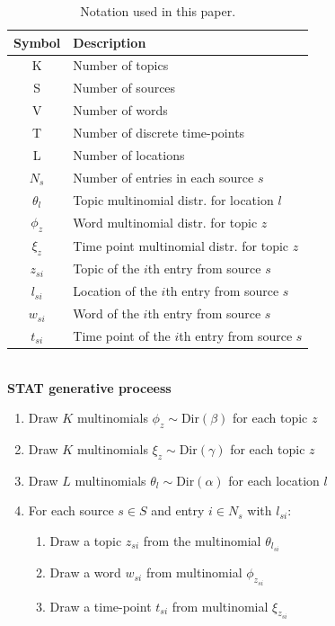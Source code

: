 \documentclass[conference]{IEEEtran}
\newcommand{\model}{{STAT}\xspace} %
\begin{document}
\begin{table}[h]
\small \centering
\caption{Notation used in this paper.}
\begin{tabular}{c l}
\hline
{\bf Symbol} & {\bf Description}  \\
\hline
K & Number of topics  \\
S & Number of sources \\
V & Number of words \\
T & Number of discrete time-points \\
L & Number of locations \\
$N_s$ & Number of entries in each source $s$\\
$\theta_l$ & Topic multinomial distr. for location $l$\\
$\phi_z$ & Word multinomial distr. for topic $z$\\
$\xi_z$ & Time point multinomial distr. for topic $z$\\
$z_{si}$ & Topic of the $i$th entry from source $s$ \\
$l_{si}$ & Location of the $i$th entry from source $s$ \\
$w_{si}$ & Word of the $i$th entry from source $s$ \\
$t_{si}$ & Time point of the $i$th entry from source $s$ \\
\hline
\end{tabular}
\label{tab:notation}
\end{table}
\ \\{\bf \model generative proceess}
\begin{enumerate}
\item Draw $K$ multinomials $\phi_z\sim\mbox{Dir}(\beta)$ for each topic $z$
\item Draw $K$ multinomials $\xi_z\sim\mbox{Dir}(\gamma)$ for each topic $z$
\item Draw $L$ multinomials $\theta_l\sim\mbox{Dir}(\alpha)$ for each location $l$
\item For each source  $s \in S$ and entry $i \in N_s$ with $l_{si}$:
\begin{enumerate}
\item Draw a topic $z_{si}$ from the multinomial $\theta_{l_{si}}$
\item Draw a word $w_{si}$ from multinomial $\phi_{z_{si}}$
\item Draw a time-point $t_{si}$ from multinomial $\xi_{z_{si}}$
\end{enumerate}
\end{enumerate}
\end{document}
